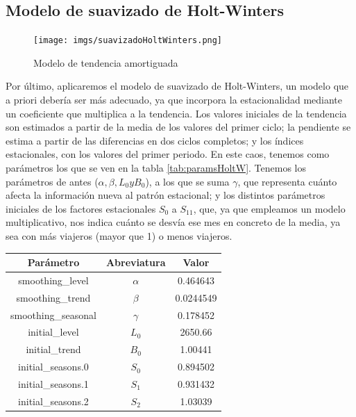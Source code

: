 \documentclass[a4paper,onecolumn]{extarticle}
\begin{document}
\begin{sloppypar}
\subsection{Modelo de suavizado de Holt-Winters} \label{suavizadoHoltWinters}
\begin{center}
    \begin{figure}[h!]
        \centering
        \texttt{[image: imgs/suavizadoHoltWinters.png]}
        \caption{Modelo de tendencia amortiguada} \label{fig:suavizadoHoltWinters}
    \end{figure}
\end{center}
Por último, aplicaremos el modelo de suavizado de Holt-Winters, un modelo que a priori debería ser más adecuado, ya que incorpora la estacionalidad mediante un
coeficiente que multiplica a la tendencia. Los valores iniciales de la tendencia son estimados a partir de la media de los valores del primer ciclo; la pendiente 
se estima a partir de las diferencias en dos ciclos completos; y los índices estacionales, con los valores del primer periodo. En este caos, tenemos como 
parámetros los que se ven en la tabla \ref{tab:paramsHoltW}. Tenemos los parámetros de antes ($\alpha, \beta, L_{0} y B_{0}$), a los que se suma $\gamma$, que 
representa cuánto afecta la información nueva al patrón estacional; y los distintos parámetros iniciales de los factores estacionales $S_{0}$ a $S_{11}$, que,
ya que empleamos un modelo multiplicativo, nos indica cuánto se desvía ese mes en concreto de la media, ya sea con más viajeros (mayor que 1) o menos viajeros.
\begin{table}[]
    \begin{center}
        \begin{tabular}{|c|c|c|}
            \hline
            \textbf{Parámetro} & \textbf{Abreviatura} & \textbf{Valor} \\
            \hline
            smoothing\_level    & $\alpha$ & 0.464643 \\
            smoothing\_trend    & $\beta$ & 0.0244549 \\
            smoothing\_seasonal & $\gamma$ & 0.178452 \\
            initial\_level      & $L_{0}$ & 2650.66 \\
            initial\_trend      & $B_{0}$ & 1.00441 \\
            initial\_seasons.0  & $S_{0}$ & 0.894502 \\
            initial\_seasons.1  & $S_{1}$ & 0.931432 \\
            initial\_seasons.2  & $S_{2}$ & 1.03039 \\

\end{tabular}
\end{center}
\end{table}
\end{sloppypar}
\end{document}
